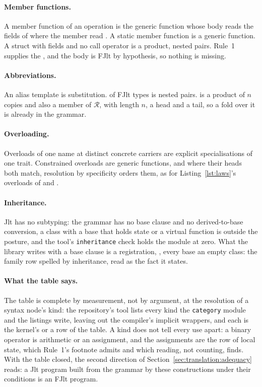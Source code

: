 \paragraph{Member functions.}
A  member function  of an operation is the generic function  whose body reads the fields of  where the member read .
A static member function is a generic function.
A struct with fields and no call operator is a product, nested pairs.
Rule~1 supplies the , and the body is FJlt by hypothesis, so nothing is missing.

\paragraph{Abbreviations.}
An alias template is substitution.
 of FJlt types is nested pairs.
 is a product of $n$ copies and also a member of $\mathcal{R}$, with length $n$, a head and a tail, so a fold over it is already in the grammar.

\paragraph{Overloading.}
Overloads of one name at distinct concrete carriers are explicit specialisations of one trait.
Constrained overloads are generic functions, and where their heads both match, resolution by specificity orders them, as for Listing~\ref{lst:laws}'s overloads of  and .

\paragraph{Inheritance.}
Jlt has no subtyping: the grammar has no base clause and no derived-to-base conversion, a class with a base that holds state or a virtual function is outside the posture, and the tool's \texttt{inheritance} check holds the module at zero.
What the library writes with a base clause is a registration, , every base an empty class: the family row spelled by inheritance, read as the fact it states.

\paragraph{What the table says.}
The table is complete by measurement, not by argument, at the resolution of a syntax node's kind: the repository's tool lists every kind the \texttt{category} module and the listings write, leaving out the compiler's implicit wrappers, and each is the kernel's or a row of the table.
A kind does not tell every use apart: a binary operator is arithmetic or an assignment, and the assignments are the row of local state, which Rule~1's footnote admits and which reading, not counting, finds.
With the table closed, the second direction of Section~\ref{sec:translation:adequacy} reads: a Jlt program built from the grammar by these constructions under their conditions is an FJlt program.
